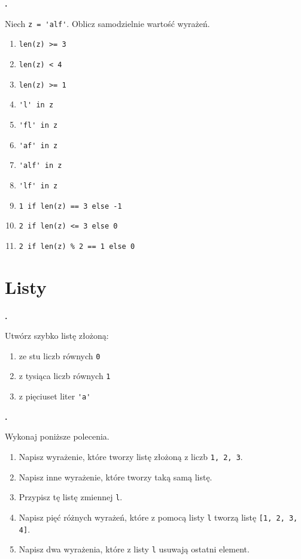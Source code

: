 \documentclass[a4paper]{article}
\begin{document}
\textbf{.}\addtocounter{zadanie}{1} Niech \verb|z = 'alf'|. Oblicz samodzielnie wartość wyrażeń.

\begin{multicols}{2}
\begin{enumerate}[label=\arabic*.]
    \item \verb|len(z) >= 3|
    \item \verb|len(z) < 4|
    \item \verb|len(z) >= 1|
    \item \verb|'l' in z|
    \item \verb|'fl' in z|
    \item \verb|'af' in z|
    \item \verb|'alf' in z|
    \item \verb|'lf' in z|
    \item \verb|1 if len(z) == 3 else -1|
    \item \verb|2 if len(z) <= 3 else 0|
    \item \verb|2 if len(z) % 2 == 1 else 0|

\end{enumerate}
\end{multicols}


\section{Listy}

\textbf{.}\addtocounter{zadanie}{1} Utwórz szybko listę złożoną:
\begin{enumerate}[label=\arabic*.]
    \item ze stu liczb równych \verb|0|
    \item z tysiąca liczb równych \verb|1|
    \item z pięciuset liter \verb|'a'|
\end{enumerate}


\textbf{.}\addtocounter{zadanie}{1} Wykonaj poniższe polecenia.
\begin{enumerate}[label=\arabic*.]
    \item Napisz wyrażenie, które tworzy listę złożoną z liczb \verb|1, 2, 3|.
    \item Napisz inne wyrażenie, które tworzy taką samą listę.
    \item Przypisz tę listę zmiennej \verb|l|.
    \item Napisz pięć różnych wyrażeń, które z pomocą listy \verb|l| tworzą listę \verb|[1, 2, 3, 4]|.
    \item Napisz dwa wyrażenia, które z listy \verb|l| usuwają ostatni element.
\end{enumerate}
\end{document}
